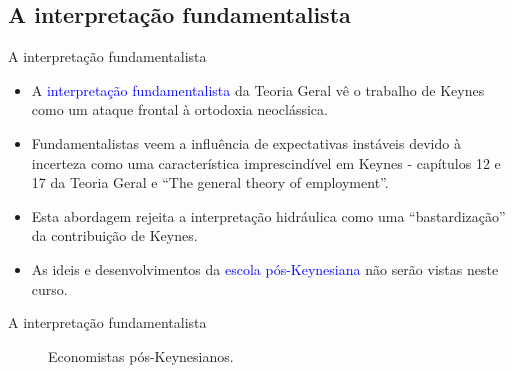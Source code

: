 \documentclass[10pt]{beamer}
\begin{document}
\subsection{A interpretação fundamentalista}
\begin{frame}{A interpretação fundamentalista}
    \begin{itemize}
        \item A \textcolor{blue}{interpretação fundamentalista} da Teoria Geral vê o trabalho de Keynes como um ataque frontal à ortodoxia neoclássica.
        \bigskip
        \item Fundamentalistas veem a influência de expectativas instáveis devido à incerteza como uma característica imprescindível em Keynes - capítulos 12 e 17 da Teoria Geral e ``The general theory of employment''.
        \bigskip
        \item Esta abordagem rejeita a interpretação hidráulica como uma ``bastardização'' da contribuição de Keynes.
        \bigskip
        \item As ideis e desenvolvimentos da \textcolor{blue}{escola pós-Keynesiana} não serão vistas neste curso.
    \end{itemize}
\end{frame}

\begin{frame}{A interpretação fundamentalista}
    \begin{figure}
        \centering
         \quad
        \caption{Economistas pós-Keynesianos.}
        \label{fig5}
    \end{figure}
\end{frame}
\end{document}
